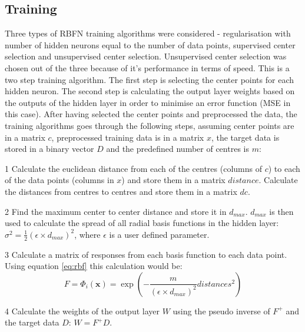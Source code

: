 \documentclass[a4paper, 11pt]{article}
\begin{document}
\subsection{Training}
Three types of RBFN training algorithms were considered - regularisation with number of hidden neurons equal to the number of data points, supervised center selection and unsupervised center selection. Unsupervised center selection was chosen out of the three because of it's performance in terms of speed. This is a two step training algorithm. The first step is selecting the center points for each hidden neuron. The second step is  calculating the output layer weights based on the outputs of the hidden layer in order to minimise an error function (MSE in this case). After having selected the center points and preprocessed the data, the training algorithms goes through the following steps, assuming center points are in a matrix $c$, preprocessed training data is in a matrix $x$, the target data is stored in a binary vector $D$ and the predefined number of centres is $m$:
\begin{list}{•}{•}


\item[1] Calculate the euclidean distance from each of the centres (columns of $c$) to each of the data points (columns in $x$) and store them in a matrix $distance$. Calculate the distances from centres to centres and store them in a matrix $dc$.  
\item[2] Find the maximum center to center distance and store it in $d_{max}$. $d_{max}$ is then used to calculate the spread of all radial basis functions in the hidden layer: $\sigma^2 = \frac{1}{2}(\epsilon \times d_{max})^2$, where $\epsilon$ is a user defined parameter. 
\item[3] Calculate a matrix of responses from each basis function to each data point. Using equation \ref{eq:rbf} this calculation would be:
\begin{equation}
F = \Phi_i(\boldsymbol{x}) = \exp\left(-\frac{m}{(\epsilon \times d_{max})^2} distances^2 \right)  
\end{equation}
\item[4] Calculate the weights of the output layer $W$ using the pseudo inverse of $F^+$ and the target data $D$: $W= F^+D$.
\end{list}
\end{document}
